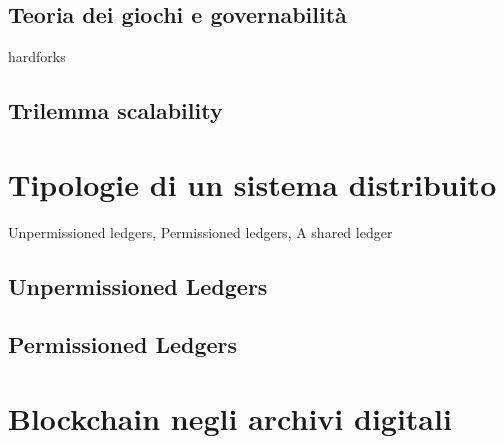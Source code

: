 \subsection{Teoria dei giochi e governabilità}

hardforks

\subsection{Trilemma scalability}

\blindtext

\section{Tipologie di un sistema distribuito} %

Unpermissioned ledgers, Permissioned ledgers, A shared ledger

\subsection{Unpermissioned Ledgers}

\subsection{Permissioned Ledgers}

\blindtext

\section{Blockchain negli archivi digitali} %




